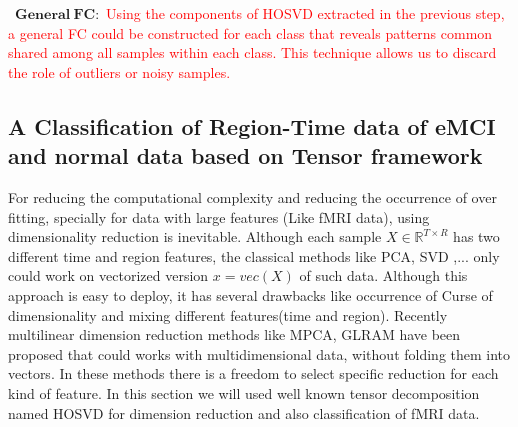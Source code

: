 \documentclass[journal]{IEEEtran}
\begin{document}
\textbullet\ $\mathbf{General~FC:}$
\textcolor{red}{
Using the components of HOSVD extracted in the previous step, a general FC could be constructed for each class that reveals patterns common shared among all samples within each class. This technique allows us to discard the role of outliers or noisy samples.  
}
	\subsection{ A Classification of Region-Time data of eMCI and normal data based on  Tensor framework}
	For reducing the computational complexity and reducing the  occurrence of over fitting, specially for data with large features (Like fMRI data), using  dimensionality reduction is inevitable. Although each sample $X\in \mathbb{R}^{T\times R}$ has two different time and region features, the classical methods like PCA, SVD ,... only could work on vectorized version $x=vec(X)$ of such data.
	Although this approach is easy to deploy, it has several drawbacks like occurrence of Curse of dimensionality and mixing different features(time and region).
	Recently multilinear dimension reduction methods like MPCA, GLRAM  have been proposed that
	could works with multidimensional data, without folding them into vectors.
	In these methods there is a freedom to select specific reduction for each kind of feature. In this section we will used well known tensor decomposition named HOSVD for dimension reduction and also classification of fMRI data.
	
\end{document}
